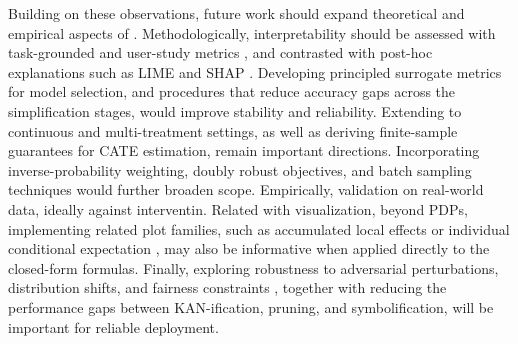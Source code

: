 Building on these observations, future work should expand theoretical and empirical aspects of \ours. Methodologically, interpretability should be assessed with task-grounded and user-study metrics \citep{TonekaboniMLHC2019}, and contrasted with post-hoc explanations such as LIME and SHAP \citep[routinely used but with different guarantees]{ribeiro2016lime,lundberg2017shap}. Developing principled surrogate metrics for model selection, and procedures that reduce accuracy gaps across the simplification stages, would improve stability and reliability. Extending \ours to continuous and multi-treatment settings, as well as deriving finite-sample guarantees for CATE estimation, remain important directions. Incorporating inverse-probability weighting, doubly robust objectives, and batch sampling techniques would further broaden scope. Empirically, validation on real-world data, ideally against interventin.  Related with visualization, beyond PDPs, implementing related plot families, such as accumulated local effects \citep{apley2020ale} or individual conditional expectation \citep{goldstein2015peeking}, may also be informative when applied directly to the closed-form formulas. Finally, exploring robustness to adversarial perturbations, distribution shifts, and fairness constraints \citep{Rudin2018StopEB}, together with reducing the performance gaps between KAN-ification, pruning, and symbolification, will be important for reliable deployment.


